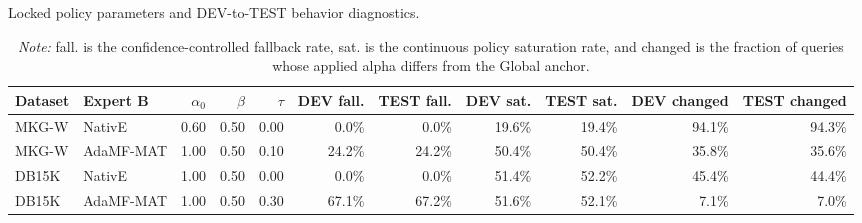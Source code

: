 \begin{table}[t]
\centering
\small
\caption{Locked policy parameters and DEV-to-TEST behavior diagnostics.}
\label{tab:supp_anchored_dynamic_diagnostics}
\setlength{\tabcolsep}{4pt}
\begin{tabular}{llrrrrrrrrr}
\toprule
Dataset & Expert B & $\alpha_0$ & $\beta$ & $\tau$ & DEV fall. & TEST fall. & DEV sat. & TEST sat. & DEV changed & TEST changed \\
\midrule
MKG-W & NativE & 0.60 & 0.50 & 0.00 & 0.0\% & 0.0\% & 19.6\% & 19.4\% & 94.1\% & 94.3\% \\
MKG-W & AdaMF-MAT & 1.00 & 0.50 & 0.10 & 24.2\% & 24.2\% & 50.4\% & 50.4\% & 35.8\% & 35.6\% \\
DB15K & NativE & 1.00 & 0.50 & 0.00 & 0.0\% & 0.0\% & 51.4\% & 52.2\% & 45.4\% & 44.4\% \\
DB15K & AdaMF-MAT & 1.00 & 0.50 & 0.30 & 67.1\% & 67.2\% & 51.6\% & 52.1\% & 7.1\% & 7.0\% \\
\bottomrule
\end{tabular}
\vspace{0.4ex}
\caption*{\footnotesize \textit{Note:} fall. is the confidence-controlled fallback rate, sat. is the continuous policy saturation rate, and changed is the fraction of queries whose applied alpha differs from the Global anchor.}
\end{table}
